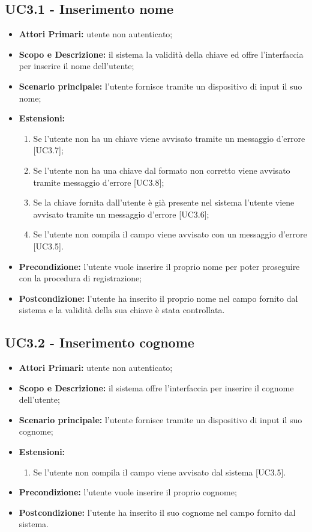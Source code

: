 \documentclass[AnalisiDeiRequisiti.tex]{subfiles}
\begin{document}
\subsection{UC3.1 - Inserimento nome}
\begin{itemize}
	\item \textbf{Attori Primari:} utente non autenticato;
	\item \textbf{Scopo e Descrizione:} il sistema  la validità della chiave ed offre l'interfaccia per inserire il nome dell'utente;
	\item \textbf{Scenario principale:} l'utente fornisce tramite un dispositivo di input il suo nome;
	\item \textbf{Estensioni:}
		\begin{enumerate}
			\item Se l'utente non ha un chiave viene avvisato tramite un messaggio d'errore [UC3.7];
			\item Se l'utente non ha una chiave dal formato non corretto viene avvisato tramite messaggio d'errore [UC3.8];
			\item Se la chiave fornita dall'utente è già presente nel sistema l'utente viene avvisato tramite un messaggio d'errore [UC3.6];
			\item Se l'utente non compila il campo viene avvisato con un messaggio d'errore [UC3.5].
		\end{enumerate}
	\item \textbf{Precondizione:} l'utente vuole inserire il proprio nome per poter proseguire con la procedura di registrazione;
	\item \textbf{Postcondizione:} l'utente ha inserito il proprio nome nel campo fornito dal sistema e la validità della sua chiave è stata controllata.
\end{itemize}	
\subsection{UC3.2 - Inserimento cognome}
\begin{itemize}
	\item \textbf{Attori Primari:} utente non autenticato;
	\item \textbf{Scopo e Descrizione:} il sistema offre l'interfaccia per inserire il cognome dell'utente;
	\item \textbf{Scenario principale:} l'utente fornisce tramite un dispositivo di input il suo cognome;
	\item \textbf{Estensioni:}
		\begin{enumerate}
				\item Se l'utente non compila il campo viene avvisato dal sistema [UC3.5].
		\end{enumerate}		
	\item \textbf{Precondizione:} l'utente vuole inserire il proprio cognome;
	\item \textbf{Postcondizione:} l'utente ha inserito il suo cognome nel campo fornito dal sistema.
\end{itemize}
\end{document}
